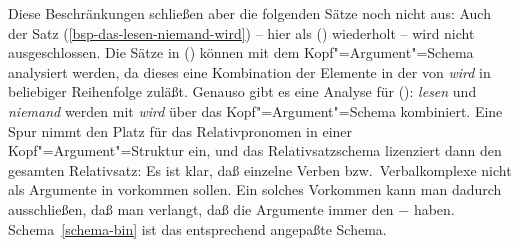 Diese Beschränkungen schließen aber die folgenden Sätze noch nicht aus:
\eal
{}
\zl
Auch der Satz (\ref{bsp-das-lesen-niemand-wird}) -- hier als () wiederholt --
wird nicht ausgeschlossen.
\z
Die Sätze in () können mit dem Kopf"=Argument"=Schema analysiert werden,
da dieses eine Kombination der Elemente in der \subcatl von \emph{wird} in beliebiger
Reihenfolge zuläßt. Genauso gibt es eine Analyse für (): \emph{lesen} und \emph{niemand}
werden mit \emph{wird} über das Kopf"=Argument"=Schema kombiniert. Eine Spur nimmt den Platz
für das Relativpronomen in einer Kopf"=Argument"=Struktur ein, und das Relativsatzschema lizenziert
dann den gesamten Relativsatz:
\z
Es ist klar, daß einzelne Verben bzw.\ Verbalkomplexe nicht als Argumente in \kasen
vorkommen sollen. Ein solches Vorkommen kann man dadurch ausschließen, daß man verlangt,
daß die Argumente immer den \lexw $-$ haben. Schema~\ref{schema-bin} ist
das entsprechend angepaßte Schema.

\begin{samepage}
\begin{schema}
\label{schema-bin}
 \impl\\
\onems{
      synsem$|$loc$|$cat$|$subcat \ibox{1} $\oplus$ \ibox{3}\\
      head-dtr$|$cat$|$subcat \ibox{1} $\oplus$ \sliste{ \ibox{2} } $\oplus$ \ibox{3} \\
      non-head-dtrs \sliste{ [ \synsem  \ibox{2} \textrm{[\textsc{lex}  $-$ ]} ] }\\
}
\end{schema}
\end{samepage}

